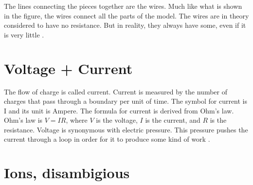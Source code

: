 \documentclass[../../Orator]{subfiles}
\begin{document}
The lines connecting the pieces together are the wires. Much like what is shown in the figure, the wires connect all the parts of the model. The wires are in theory considered to have no resistance. But in reality, they always have some, even if it is very little \cite{}. 


 \section{Voltage + Current}
The flow of charge is called current. Current is measured by the number of charges that pass through a boundary per unit of time. The symbol for current is I and its unit is Ampere. The formula for current is derived from Ohm's law. Ohm's law is \(V=IR\), where \(V\) is the voltage, \(I\) is the current, and \(R\) is the resistance. Voltage is synonymous with electric pressure. This pressure pushes the current through a loop in order for it to produce some kind of work \cite{}. 


\section{Ions, disambigious}


\end{document}

